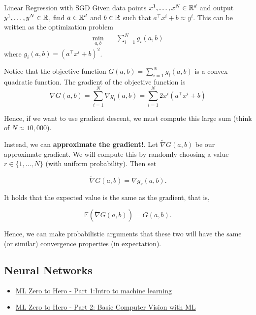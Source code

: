 \begin{example}{Linear Regression with SGD}{}
Given data points $x^1, \dots, x^N \in {\mathbb{R}}^d$ and output $y^1, \dots, y^N \in {\mathbb{R}}$, find $a \in {\mathbb{R}}^d$ and $b \in {\mathbb{R}}$ such that $a^\top x^i + b \approx y^i$.   This can be written as the optimization problem 
\begin{equation}
\begin{array}{rl}
\min_{a,b} \quad & \sum_{i=1}^N g_i(a,b)
\end{array}
\end{equation}
where $g_i(a,b) = (a^\top x^i + b)^2$.   

Notice that the objective function $G(a,b) = \sum_{i=1}^N g_i(a,b)$  is a convex quadratic function.  The gradient of the objective function is 
$$
\nabla G(a,b) = \sum_{i=1}^N \nabla g_i(a,b) = \sum_{i=1}^N 2x^i (a^\top x^i + b)
$$

Hence, if we want to use gradient descent, we must compute this large sum (think of $N \approx 10,000$).  

Instead, we can \textbf{approximate the gradient!}.  Let $\tilde \nabla G(a,b)$ be our approximate gradient.  We will compute this by randomly choosing a value $r \in \{1, \dots, N\}$ (with uniform probability).  Then set

$$
\tilde \nabla G(a,b) = \nabla g_r(a,b).
$$

It holds that the expected value is the same as the gradient, that is,

$$
\mathbb{E}(\tilde \nabla G(a,b)) = G(a,b).
$$


Hence, we can make probabilistic arguments that these two will have the same (or similar) convergence properties (in expectation).
\end{example}

\subsection{Neural Networks}

\begin{resource}
\begin{itemize}
\item \href{https://www.youtube.com/watch?v=KNAWp2S3w94&feature=emb_logo&ab_channel=TensorFlow}{ML Zero to Hero - Part 1:Intro to machine learning}
\item \href{https://www.youtube.com/watch?v=bemDFpNooA8&ab_channel=TensorFlow}{ML Zero to Hero - Part 2: Basic Computer Vision with ML}
\end{itemize}
\end{resource}



